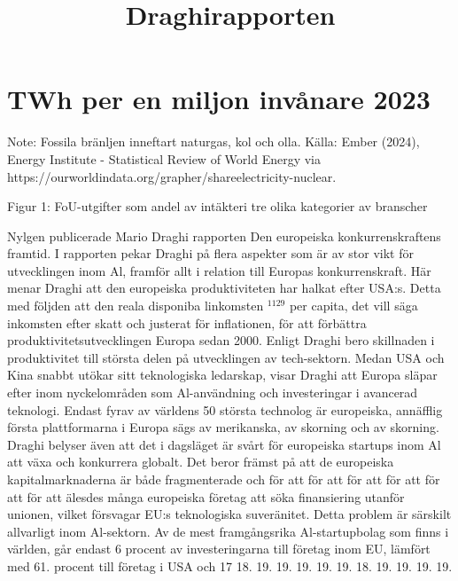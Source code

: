 {\section*{TWh per en miljon invånare 2023}

Note: Fossila bränljen inneftart naturgas, kol och olla.
Källa: Ember (2024), Energy Institute - Statistical Review of World Energy via https://ourworldindata.org/grapher/shareelectricity-nuclear.

Figur 1: FoU-utgifter som andel av intäkteri tre olika kategorier av branscher

\title{
Draghirapporten
}
Nylgen publicerade Mario Draghi rapporten Den europeiska konkurrenskraftens framtid. I rapporten pekar Draghi på flera aspekter som är av stor vikt för utvecklingen inom Al, framför allt i relation till Europas konkurrenskraft.
Här menar Draghi att den europeiska produktiviteten har halkat efter USA:s. Detta med följden att den reala disponiba linkomsten \({ }^{1129}\) per capita, det vill säga inkomsten efter skatt och justerat för inflationen, för att förbättra produktivitetsutvecklingen Europa sedan 2000. Enligt Draghi bero skillnaden i produktivitet till största delen på utvecklingen av tech-sektorn. Medan USA och Kina snabbt utökar sitt teknologiska ledarskap, visar Draghi att Europa släpar efter inom nyckelområden som Al-användning och investeringar i avancerad teknologi. Endast fyrav av världens 50 största technolog är europeiska, annäfflig första plattformarna i Europa sägs av merikanska, av skorning och av skorning.
Draghi belyser även att det i dagsläget är svårt för europeiska startups inom Al att växa och konkurrera globalt. Det beror främst på att de europeiska kapitalmarknaderna är både fragmenterade och för att för att för att för att för att för att älesdes många europeiska företag att söka finansiering utanför unionen, vilket försvagar EU:s teknologiska suveränitet. Detta problem är särskilt allvarligt inom Al-sektorn. Av de mest framgångsrika Al-startupbolag som finns i världen, går endast 6 procent av investeringarna till företag inom EU, lämfört med 61. procent till företag i USA och 17 18. 19. 19. 19. 19. 19. 18. 19. 19. 19. 19.
}
